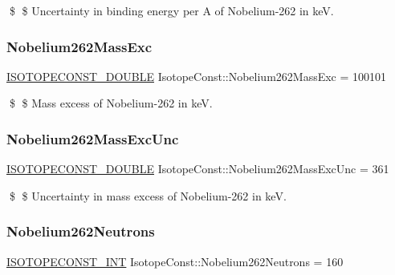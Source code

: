 \$ \$ Uncertainty in binding energy per A of Nobelium-\/262 in keV. \mbox{\label{group___isotope_const-_nobelium-_no262_ga17291cb2a28931f695c95bdbeff1c7dc}} 
\subsubsection{\texorpdfstring{Nobelium262\+Mass\+Exc}{Nobelium262MassExc}}
{\footnotesize\ttfamily \mbox{\hyperlink{group___isotope_const-_macros_ga8f45a7272ce02c0b4c65c44636ed719a}{I\+S\+O\+T\+O\+P\+E\+C\+O\+N\+S\+T\+\_\+\+D\+O\+U\+B\+LE}} Isotope\+Const\+::\+Nobelium262\+Mass\+Exc = 100101}

\$ \$ Mass excess of Nobelium-\/262 in keV. \mbox{\label{group___isotope_const-_nobelium-_no262_gab43c41b617c7bdcb82f6cc120a5556a4}} 
\subsubsection{\texorpdfstring{Nobelium262\+Mass\+Exc\+Unc}{Nobelium262MassExcUnc}}
{\footnotesize\ttfamily \mbox{\hyperlink{group___isotope_const-_macros_ga8f45a7272ce02c0b4c65c44636ed719a}{I\+S\+O\+T\+O\+P\+E\+C\+O\+N\+S\+T\+\_\+\+D\+O\+U\+B\+LE}} Isotope\+Const\+::\+Nobelium262\+Mass\+Exc\+Unc = 361}

\$ \$ Uncertainty in mass excess of Nobelium-\/262 in keV. \mbox{\label{group___isotope_const-_nobelium-_no262_ga9559a4f2f26b9ecb19949374600c7bfa}} 
\subsubsection{\texorpdfstring{Nobelium262\+Neutrons}{Nobelium262Neutrons}}
{\footnotesize\ttfamily \mbox{\hyperlink{group___isotope_const-_macros_ga5f18360b3e99483a35c32d789e62621c}{I\+S\+O\+T\+O\+P\+E\+C\+O\+N\+S\+T\+\_\+\+I\+NT}} Isotope\+Const\+::\+Nobelium262\+Neutrons = 160}

